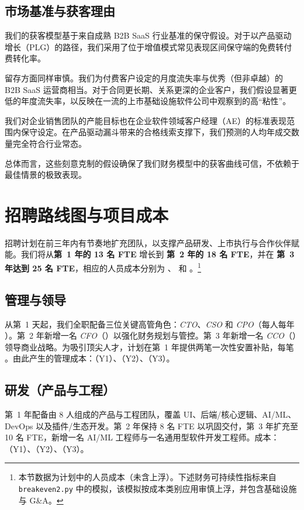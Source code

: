 \documentclass[11pt, a4paper, oneside]{article}
\begin{document}
\subsection{市场基准与获客理由}

我们的获客模型基于来自成熟 B2B SaaS 行业基准的保守假设。对于以产品驱动增长（PLG）的路径，我们采用了位于增值模式常见表现区间保守端的免费转付费转化率。

留存方面同样审慎。我们为付费客户设定的月度流失率与优秀（但非卓越）的 B2B SaaS 运营商相当。对于合同更长期、关系更深的企业客户，我们假设显著更低的年度流失率，以反映在一流的上市基础设施软件公司中观察到的高“粘性”。

我们对企业销售团队的产能目标也在企业软件领域客户经理（AE）的标准表现范围内保守设定。在产品驱动漏斗带来的合格线索支撑下，我们预测的人均年成交数量完全符合行业常态。

总体而言，这些刻意克制的假设确保了我们财务模型中的获客曲线可信，不依赖于最佳情景的极致表现。

\newpage
\section{招聘路线图与项目成本}
\label{sec:hiring-roadmap}

招聘计划在前三年内有节奏地扩充团队，以支撑产品研发、上市执行与合作伙伴赋能。我们将从\textbf{第~1 年的 13 名 FTE} 增长到 \textbf{第~2 年的 18 名 FTE}，并在 \textbf{第~3 年达到 25 名 FTE}，相应的人员成本分别为 \textbf{}、\textbf{} 和 \textbf{}。\footnote{本节数据为计划中的人员成本（未含上浮）。下述财务可持续性指标来自 \texttt{breakeven2.py} 中的模拟，该模拟按成本类别应用审慎上浮，并包含基础设施与 G\&A。}

\subsection{管理与领导}
从第~1 天起，我们全职配备三位关键高管角色：\textit{CTO}、\textit{CSO} 和 \textit{CPO}（每人每年 ）。第~2 年新增一名 \textit{CFO}（）以强化财务规划与管控。第~3 年新增一名 \textit{CCO}（）领导商业战略。为吸引顶尖人才，计划在第~1 年提供两笔一次性安置补贴，每笔 。由此产生的管理成本：\textbf{}（Y1）、\textbf{}（Y2）、\textbf{}（Y3）。

\subsection{研发（产品与工程）}
第~1 年配备由 8 人组成的产品与工程团队，覆盖 UI、后端/核心逻辑、AI/ML、DevOps 以及插件/生态开发。第~2 年保持 8 名 FTE 以巩固交付，第~3 年扩充至 10 名 FTE，新增一名 AI/ML 工程师与一名通用型软件开发工程师。成本：\textbf{}（Y1）、\textbf{}（Y2）、\textbf{}（Y3）。
\end{document}
